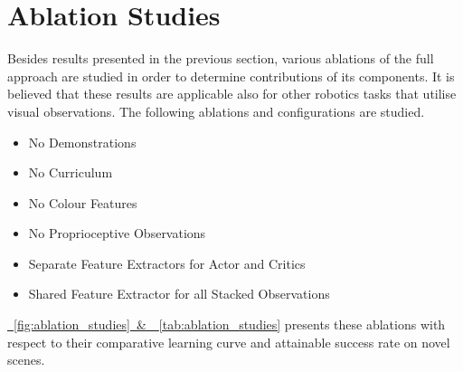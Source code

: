 \newpage

\section{Ablation Studies}

Besides results presented in the previous section, various ablations of the full approach are studied in order to determine contributions of its components. It is believed that these results are applicable also for other robotics tasks that utilise visual observations. The following ablations and configurations are studied.
\vspace{-\topsep}
\begin{itemize}
    \itemsep -2.5mm
    \item No Demonstrations
    \item No Curriculum
    \item No Colour Features
    \item No Proprioceptive Observations
    \item Separate Feature Extractors for Actor and Critics
    \item Shared Feature Extractor for all Stacked Observations
\end{itemize}
\vspace{-\topsep}
\hyperref[fig:ablation_studies]{\figurename~\ref*{fig:ablation_studies}~\&~\tablename~\ref*{tab:ablation_studies}} presents these ablations with respect to their comparative learning curve and attainable success rate on novel scenes.

